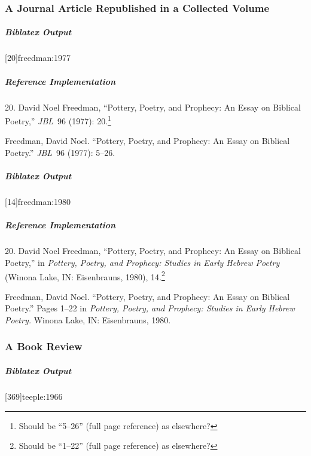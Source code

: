 \documentclass[a4paper]{article}
\newenvironment{biboutput}{%
  \subparagraph{Biblatex Output}
}{\color{black}}
\newenvironment{refimp}{%
  \subparagraph{Reference Implementation}
  \color{reference-colour}
  \rm
}{\par\color{black}}
\begin{document}
\subsubsection{A Journal Article Republished in a Collected Volume}

\begin{biboutput}
  [20]{freedman:1977}
\end{biboutput}

\begin{refimp}
  \hspace*{\bibindent}20. David Noel Freedman, “Pottery, Poetry, and Prophecy:
  An Essay on Biblical Poetry,” \emph{JBL}~96 (1977): 20.\footnote{Should be
  “5–26” (full page reference) as elsewhere?}

  \hangindent\bibindent Freedman, David Noel. “Pottery, Poetry, and Prophecy:
  An Essay on Biblical Poetry.” \emph{JBL}~96 (1977): 5–26.

\end{refimp}

\begin{biboutput}
  [14]{freedman:1980}
\end{biboutput}

\begin{refimp}
  \hspace*{\bibindent}20. David Noel Freedman, “Pottery, Poetry, and Prophecy:
  An Essay on Biblical Poetry,” in \emph{Pottery, Poetry, and Prophecy:
  Studies in Early Hebrew Poetry} (Winona Lake, IN: Eisenbrauns, 1980),
  14.\footnote{Should be “1–22” (full page reference) as elsewhere?}

  \hangindent\bibindent Freedman, David Noel. “Pottery, Poetry, and Prophecy:
  An Essay on Biblical Poetry.” Pages 1–22 in \emph{Pottery, Poetry, and
  Prophecy: Studies in Early Hebrew Poetry.} Winona Lake, IN: Eisenbrauns,
  1980.
\end{refimp}

\subsubsection{A Book Review}

\begin{biboutput}
  [369]{teeple:1966}
\end{biboutput}
\end{document}
